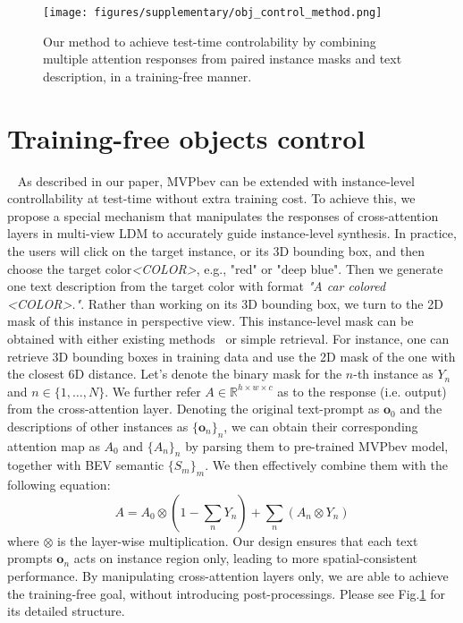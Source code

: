 \documentclass[sigconf]{acmart}
\begin{document}
\begin{figure}[ht]
\centering
\texttt{[image: figures/supplementary/obj\_control\_method.png]}
\caption{Our method to achieve test-time controlability by combining multiple attention responses from paired instance masks and text description, in a training-free manner.
}
\label{fig:obj_control_method}
\end{figure}

\section{Training-free objects control}~\label{control_method}
As described in our paper, MVPbev can be extended with instance-level controllability at test-time without extra training cost. To achieve this, we propose a special mechanism that manipulates the responses of cross-attention layers in multi-view LDM to accurately guide instance-level synthesis. In practice, the users will click on the target instance, or its 3D bounding box, and then choose the target color\textit{<COLOR>}, e.g., "red" or "deep blue". Then we generate one text description from the target color with format \textit{"A car colored <COLOR>."}. Rather than working on its 3D bounding box, we turn to the 2D mask of this instance in perspective view. This instance-level mask can be obtained with either existing methods~\cite{cheng2022masked} or simple retrieval. For instance, one can retrieve 3D bounding boxes in training data and use the 2D mask of the one with the closest 6D distance. %
Let's denote the binary mask for the $n$-th instance as $Y_n$ and $n\in\{1,\dots,N\}$. We further refer $A\in\mathbb{R}^{h\times w\times c}$ as to the response (i.e. output) from the cross-attention layer. Denoting the original text-prompt as $\textbf{o}_0$ and the descriptions of other instances as $\{\textbf{o}_n\}_n$, we can obtain their corresponding attention map as $A_0$ and $\{A_n\}_n$ by parsing them to pre-trained MVPbev model, together with BEV semantic $\{S_m\}_m$. We then effectively combine them with the following equation:
\begin{equation}
    A = A_0 \otimes (1 - \sum_n Y_n) + \sum_n (A_n \otimes Y_n)
\end{equation}
where $\otimes$ is the layer-wise multiplication. Our design ensures that each text prompts $\textbf{o}_n$ acts on instance region only, leading to more spatial-consistent performance. By manipulating cross-attention layers only, we are able to achieve the training-free goal, without introducing post-processings. 
Please see Fig.\ref{fig:obj_control_method} for its detailed structure.
\end{document}
